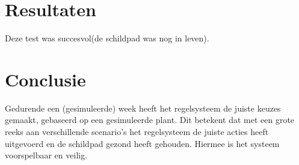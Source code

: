 \documentclass[a4paper]{report}
\begin{document}
\section{Resultaten}
Deze test was succesvol(de schildpad was nog in leven).

\section{Conclusie}
Gedurende een (gesimuleerde) week heeft het regelsysteem de juiste keuzes gemaakt, gebaseerd op een gesimuleerde plant.
Dit betekent dat met een grote reeks aan verschillende scenario's het regelsysteem de juiste acties heeft uitgevoerd en de schildpad gezond heeft gehouden.
Hiermee is het systeem voorspelbaar en veilig.
\end{document}
